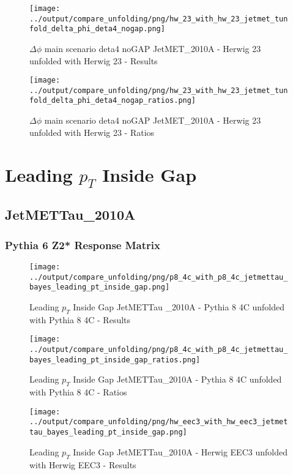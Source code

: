 \documentclass[11pt]{book}
\begin{document}
\begin{figure}[ht]
\centering
\texttt{[image: ../output/compare\_unfolding/png/hw\_23\_with\_hw\_23\_jetmet\_tunfold\_delta\_phi\_deta4\_nogap.png]}
\caption{$\Delta\phi$ main scenario deta4 noGAP JetMET\_2010A - Herwig 23 unfolded with Herwig 23 - Results}
\label{hw_23_hw_23_jetmet_tunfold_delta_phi_deta4_nogap_a}
\end{figure}

\begin{figure}[ht]
\centering
\texttt{[image: ../output/compare\_unfolding/png/hw\_23\_with\_hw\_23\_jetmet\_tunfold\_delta\_phi\_deta4\_nogap\_ratios.png]}
\caption{$\Delta\phi$ main scenario deta4 noGAP JetMET\_2010A - Herwig 23 unfolded with Herwig 23 - Ratios}
\label{hw_23_hw_23_jetmet_tunfold_delta_phi_deta4_nogap_b}
\end{figure}




\newpage
\chapter{Leading $p_{T}$ Inside Gap}
\section{JetMETTau\_2010A}
\subsection{Pythia 6 Z2* Response Matrix}


\begin{figure}[ht]
\centering
\texttt{[image: ../output/compare\_unfolding/png/p8\_4c\_with\_p8\_4c\_jetmettau\_bayes\_leading\_pt\_inside\_gap.png]}
\caption{Leading $p_{T}$ Inside Gap JetMETTau \_2010A - Pythia 8 4C unfolded with Pythia 8 4C - Results}
\label{p8_p8_jetmettau_bayes_leading_pt_inside_gap_a}
\end{figure}

\begin{figure}[ht]
\centering
\texttt{[image: ../output/compare\_unfolding/png/p8\_4c\_with\_p8\_4c\_jetmettau\_bayes\_leading\_pt\_inside\_gap\_ratios.png]}
\caption{Leading $p_{T}$ Inside Gap JetMETTau\_2010A - Pythia 8 4C unfolded with Pythia 8 4C - Ratios}
\label{p8_p8_jetmettau_bayes_leading_pt_inside_gap_b}
\end{figure}

\begin{figure}[ht]
\centering
\texttt{[image: ../output/compare\_unfolding/png/hw\_eec3\_with\_hw\_eec3\_jetmettau\_bayes\_leading\_pt\_inside\_gap.png]}
\caption{Leading $p_{T}$ Inside Gap JetMETTau\_2010A - Herwig EEC3 unfolded with Herwig EEC3 - Results}
\label{hw_eec3_hw_eec3_jetmettau_bayes_leading_pt_inside_gap_a}
\end{figure}
\end{document}
